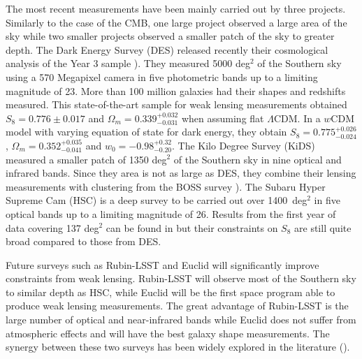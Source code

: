     The most recent measurements have been mainly carried out by three projects. 
    Similarly to the case of the CMB, one large project observed a large area of the sky 
    while two smaller projects observed a smaller patch of the sky to greater depth. 
    The Dark Energy Survey (DES) released recently their cosmological analysis of the Year 3 sample 
    \cite{descollaborationDarkEnergySurvey2021}). They measured 5000 deg$^2$ of the Southern sky 
    using a 570 Megapixel camera in five photometric bands up to a limiting magnitude of 23. 
    More than 100 million galaxies had their shapes and redshifts measured. 
    This state-of-the-art sample for weak lensing measurements obtained $S_8 = 0.776 \pm 0.017$
    and $\Omega_m = 0.339^{+0.032}_{-0.031}$
    when assuming flat $\Lambda$CDM. In a $w$CDM model with 
    varying equation of state for dark energy, they obtain 
    $S_8 = 0.775^{+0.026}_{-0.024}$, $\Omega_m = 0.352^{+0.035}_{-0.041}$ and $w_0 = -0.98^{+0.32}_{-0.20}$. 
    The Kilo Degree Survey (KiDS) measured a smaller patch of 1350 deg$^2$ of the Southern sky 
    in nine optical and infrared bands. Since they area is not as large as DES, 
    they combine their lensing measurements with clustering from the BOSS survey \cite{heymansKiDS1000CosmologyMultiprobe2021}). 
    The Subaru Hyper Supreme Cam (HSC) is a deep survey to be carried out over 1400~deg$^2$ 
    in five optical bands up to a limiting magnitude of 26. Results from the first year of data covering 137 deg$^2$ 
    can be found in  \cite{hikageCosmologyCosmicShear2019} but their constraints on $S_8$ are still quite broad
    compared to those from DES. 

    Future surveys such as Rubin-LSST and Euclid will significantly improve constraints from weak lensing. 
    Rubin-LSST will observe most of the Southern sky to similar depth as HSC, while Euclid will be 
    the first space program able to produce weak lensing measurements. The great advantage of Rubin-LSST 
    is the large number of optical and near-infrared bands while Euclid does not suffer from atmospheric effects 
    and will have the best galaxy shape measurements. 
    The synergy between these two surveys has been widely explored in the literature 
    (\cite{jainWholeGreaterSum2015, rhodesScientificSynergyLSST2017, capakEnhancingLSSTScience2019}). 
    




